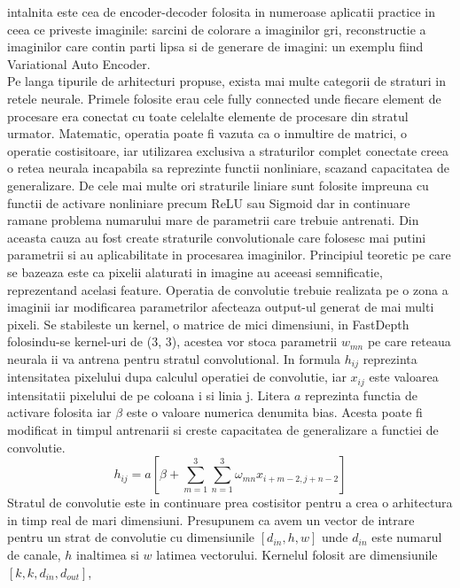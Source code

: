\documentclass[12pt,a4paper]{report}
\begin{document}
intalnita este cea de encoder-decoder folosita in numeroase aplicatii practice in ceea ce 
priveste imaginile: sarcini de colorare a imaginilor gri, reconstructie a imaginilor care 
contin parti lipsa si de generare de imagini: un exemplu fiind Variational Auto Encoder. \\
Pe langa tipurile de arhitecturi propuse, exista mai multe categorii de straturi in retele neurale.
Primele folosite erau cele fully connected unde fiecare element de procesare era conectat 
cu toate celelalte elemente de procesare din stratul urmator. Matematic, operatia poate fi vazuta 
ca o inmultire de matrici, o operatie costisitoare, iar utilizarea exclusiva a straturilor complet 
conectate creea o retea neurala incapabila sa reprezinte functii nonliniare, scazand capacitatea de
generalizare. De cele mai multe ori straturile liniare sunt folosite impreuna cu functii de
activare nonliniare precum ReLU sau Sigmoid dar in continuare ramane problema numarului mare 
de parametrii care trebuie antrenati. Din aceasta cauza au fost create straturile convolutionale
care  folosesc mai putini parametrii si au aplicabilitate in procesarea imaginilor. Principiul
teoretic pe care se bazeaza este ca pixelii alaturati in imagine au aceeasi semnificatie,
reprezentand acelasi feature. Operatia de convolutie trebuie realizata pe o zona a imaginii iar
modificarea parametrilor afecteaza output-ul generat de mai multi pixeli. Se stabileste un kernel,
o matrice de  mici dimensiuni, in FastDepth folosindu-se kernel-uri de (3, 3), acestea vor stoca
parametrii \(w_{mn}\) pe care reteaua neurala ii va antrena pentru stratul 
convolutional. In formula \(h_{ij}\) reprezinta intensitatea pixelului dupa calculul
operatiei de convolutie, iar \(x_{ij}\) este valoarea intensitatii pixelului de pe coloana i si linia j.  
Litera \(a\) reprezinta functia de activare folosita iar \(\beta\) este o valoare numerica
denumita bias. Acesta poate fi modificat in timpul antrenarii si creste
capacitatea de generalizare a functiei de convolutie.  
\begin{equation}
h_{ij} = a \left[ \beta + \sum_{m=1}^{3} \sum_{n=1}^{3} \omega_{mn} x_{i+m-2, j+n-2} \right]
\end{equation}
Stratul de convolutie este in continuare prea costisitor pentru a crea o arhitectura in timp
real de mari dimensiuni. Presupunem ca avem un vector de intrare pentru un strat de convolutie
cu dimensiunile \([d_{in}, h, w]\) unde \(d_{in}\) este numarul de canale,  \(h \) inaltimea si \(w\) latimea vectorului.
Kernelul folosit are dimensiunile \([k, k, d_{in}, d_{out}]\),
\end{document}
